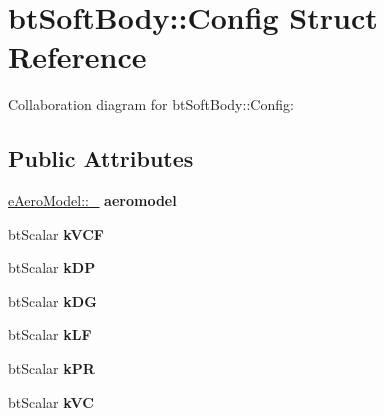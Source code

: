 \hypertarget{structbt_soft_body_1_1_config}{\section{bt\+Soft\+Body\+:\+:Config Struct Reference}
\label{structbt_soft_body_1_1_config}
}


Collaboration diagram for bt\+Soft\+Body\+:\+:Config\+:
\subsection*{Public Attributes}
\begin{DoxyCompactItemize}
\item 
\hypertarget{structbt_soft_body_1_1_config_a91b7375ace054ae67744aa417579dfa3}{\hyperlink{structbt_soft_body_1_1e_aero_model_a147f4e50f7cfaa2855b5ea5b4b2986ae}{e\+Aero\+Model\+::\+\_\+} {\bfseries aeromodel}}\label{structbt_soft_body_1_1_config_a91b7375ace054ae67744aa417579dfa3}

\item 
\hypertarget{structbt_soft_body_1_1_config_a18eec41b81c8a86632b2c9b1892ae462}{bt\+Scalar {\bfseries k\+V\+C\+F}}\label{structbt_soft_body_1_1_config_a18eec41b81c8a86632b2c9b1892ae462}

\item 
\hypertarget{structbt_soft_body_1_1_config_a307cb6ef5523b702defdbabe51ec9603}{bt\+Scalar {\bfseries k\+D\+P}}\label{structbt_soft_body_1_1_config_a307cb6ef5523b702defdbabe51ec9603}

\item 
\hypertarget{structbt_soft_body_1_1_config_a00138980dda3355a50e2f5d79107d772}{bt\+Scalar {\bfseries k\+D\+G}}\label{structbt_soft_body_1_1_config_a00138980dda3355a50e2f5d79107d772}

\item 
\hypertarget{structbt_soft_body_1_1_config_aaf819d51d8c1774bd5629965fbd53be6}{bt\+Scalar {\bfseries k\+L\+F}}\label{structbt_soft_body_1_1_config_aaf819d51d8c1774bd5629965fbd53be6}

\item 
\hypertarget{structbt_soft_body_1_1_config_a659a04711566fac7268d50c1c7384035}{bt\+Scalar {\bfseries k\+P\+R}}\label{structbt_soft_body_1_1_config_a659a04711566fac7268d50c1c7384035}

\item 
\hypertarget{structbt_soft_body_1_1_config_a6057779d5267a9e600bb4055d1f7f2c2}{bt\+Scalar {\bfseries k\+V\+C}}\label{structbt_soft_body_1_1_config_a6057779d5267a9e600bb4055d1f7f2c2}


\end{DoxyCompactItemize}
